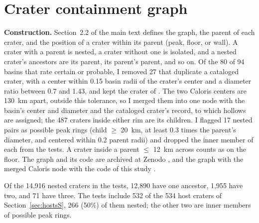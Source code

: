 \documentclass{planetary}
\begin{document}
\clearpage

\section{Crater containment graph}
\label{sec:dagS}

\textbf{Construction.} Section~2.2 of the main text defines the graph, the parent of each crater, and the position of a crater within its parent (peak, floor, or wall). A crater with a parent is nested, a crater without one is isolated, and a nested crater's ancestors are its parent, its parent's parent, and so on. Of the 80 of 94 basins that \textcite{orgel2020} rate certain or probable, I removed 27 that duplicate a cataloged crater, with a center within 0.15 basin radii of the crater's center and a diameter ratio between 0.7 and 1.43, and kept the crater of \textcite{herrick2018}. The two Caloris centers are 130~km apart, outside this tolerance, so I merged them into one node with the basin's center and diameter and the cataloged crater's record, to which hollows are assigned; the 487 craters inside either rim are its children. I flagged 17 nested pairs as possible peak rings (child $\geq$ 20~km, at least 0.3 times the parent's diameter, and centered within 0.2 parent radii) and dropped the inner member of each from the tests. A crater inside a parent $\leq$ 12~km across counts as on the floor. The graph and its code are archived at Zenodo \parencite{zenodo_cratergraph}, and the graph with the merged Caloris node with the code of this study \parencite{zenodo_this}.

Of the 14,916 nested craters in the tests, 12,890 have one ancestor, 1,955 have two, and 71 have three. The tests include 532 of the 534 host craters of Section~\ref{sec:hostsS}, 266 (50\%) of them nested; the other two are inner members of possible peak rings.
\end{document}
